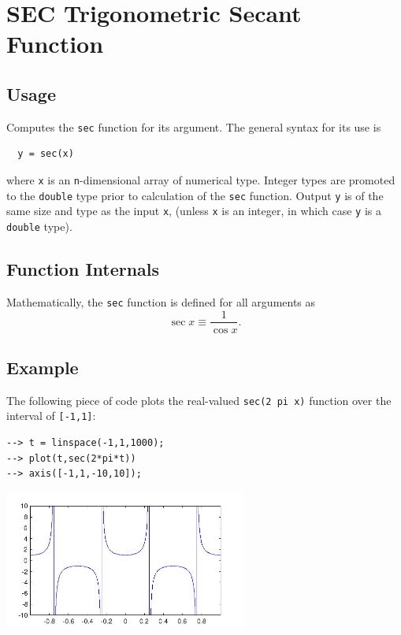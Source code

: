 \section{SEC Trigonometric Secant Function}

\subsection{Usage}

Computes the \verb|sec| function for its argument.  The general
syntax for its use is
\begin{verbatim}
  y = sec(x)
\end{verbatim}
where \verb|x| is an \verb|n|-dimensional array of numerical type.
Integer types are promoted to the \verb|double| type prior to
calculation of the \verb|sec| function.  Output \verb|y| is of the
same size and type as the input \verb|x|, (unless \verb|x| is an
integer, in which case \verb|y| is a \verb|double| type).  
\subsection{Function Internals}

Mathematically, the \verb|sec| function is defined for all arguments
as
\[
   \sec x \equiv \frac{1}{\cos x}.
\]
\subsection{Example}

The following piece of code plots the real-valued \verb|sec(2 pi x)|
function over the interval of \verb|[-1,1]|:
\begin{verbatim}
--> t = linspace(-1,1,1000);
--> plot(t,sec(2*pi*t))
--> axis([-1,1,-10,10]);
\end{verbatim}


\centerline{\includegraphics[width=8cm]{secplot}}


